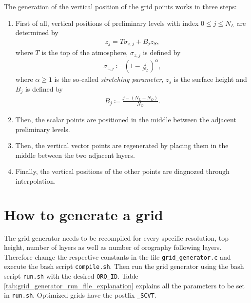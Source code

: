 \documentclass[10pt]{report}
\begin{document}
The generation of the vertical position of the grid points works in three steps:
%
\begin{enumerate}
\item First of all, vertical positions of preliminary levels with index $0 \leq j \leq N_L$ are determined by
%
\begin{align}
z_j = T\sigma_{z, j} + B_jz_S,
\end{align}
%
where $T$ is the top of the atmosphere, $\sigma_{z, j}$ is defined by
%
\begin{align}
\sigma_{z, j} \coloneqq \left(1 - \frac{j}{N_L}\right)^\alpha,
\end{align}
%
where $\alpha \geq 1$ is the so-called \textit{stretching parameter}, $z_s$ is the surface height and $B_j$ is defined by
%
\begin{align}
B_j \coloneqq \frac{j - \left(N_L - N_O\right)}{N_O}.
\end{align}
%
\item Then, the scalar points are positioned in the middle between the adjacent preliminary levels.
\item Then, the vertical vector points are regenerated by placing them in the middle between the two adjacent layers.
\item Finally, the vertical positions of the other points are diagnozed through interpolation.
\end{enumerate}

\section{How to generate a grid}
\label{sec:how_to_generate_a_grid}

The grid generator needs to be recompiled for every specific resolution, top height, number of layers as well as number of orography following layers. Therefore change the respective constants in the file \texttt{grid\_generator.c} and execute the bash script \texttt{compile.sh}. Then run the grid generator using the bash script \texttt{run.sh} with the desired \texttt{\texttt{ORO\_ID}}. Table \ref{tab:grid_generator_run_file_explanation} explains all the parameters to be set in \texttt{run.sh}. Optimized grids have the postfix \texttt{\_SCVT}.
\end{document}
